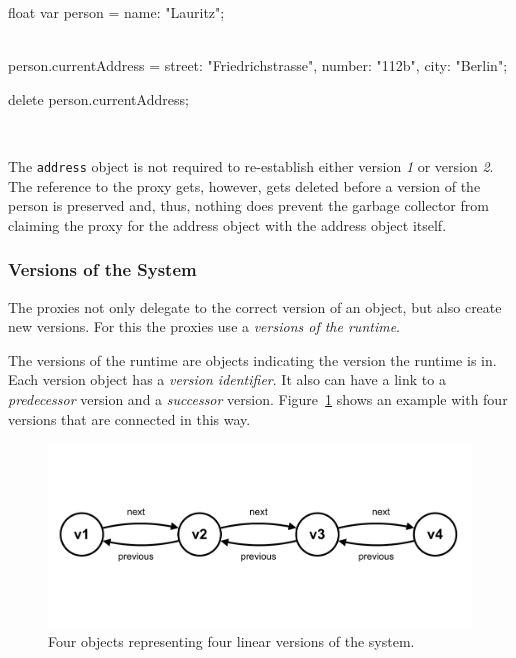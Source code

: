 \begin{code}{}{float}
    var person = {name: "Lauritz"};
    
    \\ [preserve first version]
    
    person.currentAddress = {street: "Friedrichstrasse",
                             number: "112b",
                             city: "Berlin"};
    
    delete person.currentAddress;
    
    \\ [preserve second version]
\end{code}
\iffalse
\end{verbatim}\fi

The \lstinline{address} object is not required to re-establish either version \emph{1} or version \emph{2}.
The reference to the proxy gets, however, gets deleted before a version of the person is preserved and, thus, nothing does prevent the garbage collector from claiming the proxy for the address object with the address object itself.


\subsubsection{Versions of the System}

The proxies not only delegate to the correct version of an object, but also create new versions.
For this the proxies use a \emph{versions of the runtime}.

The versions of the runtime are objects indicating the version the runtime is in.
Each version object has a \emph{version identifier}.
It also can have a link to a \emph{predecessor} version and a \emph{successor} version.
Figure~\ref{fig:SystemVersions} shows an example with four versions that are connected in this way.

\begin{figure}[h]
    \centering
    \includegraphics[width=\textwidth]{figures/4_approach/8_runtimeVersionObjects.pdf}
    \caption{Four objects representing four linear versions of the system.}
    \label{fig:SystemVersions}
\end{figure}

